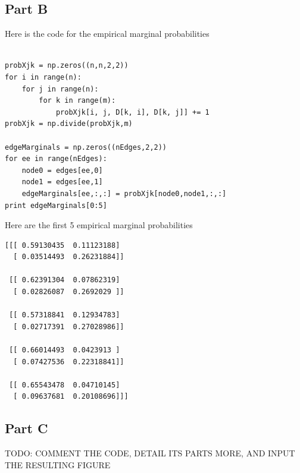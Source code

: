 \documentclass[twoside,11pt]{article}
\theoremstyle{definition}
\begin{document}
\newpage

\subsection*{Part B}

Here is the code for the empirical marginal probabilities
\begin{lstlisting}

probXjk = np.zeros((n,n,2,2))
for i in range(n):
    for j in range(n):
        for k in range(m):
            probXjk[i, j, D[k, i], D[k, j]] += 1
probXjk = np.divide(probXjk,m)

edgeMarginals = np.zeros((nEdges,2,2))
for ee in range(nEdges):
    node0 = edges[ee,0]
    node1 = edges[ee,1]
    edgeMarginals[ee,:,:] = probXjk[node0,node1,:,:]
print edgeMarginals[0:5]

\end{lstlisting}

Here are the first 5 empirical marginal probabilities

\begin{lstlisting}
[[[ 0.59130435  0.11123188]
  [ 0.03514493  0.26231884]]

 [[ 0.62391304  0.07862319]
  [ 0.02826087  0.2692029 ]]

 [[ 0.57318841  0.12934783]
  [ 0.02717391  0.27028986]]

 [[ 0.66014493  0.0423913 ]
  [ 0.07427536  0.22318841]]

 [[ 0.65543478  0.04710145]
  [ 0.09637681  0.20108696]]]
\end{lstlisting}

\subsection*{Part C}

TODO: COMMENT THE CODE, DETAIL ITS PARTS MORE, AND INPUT THE RESULTING FIGURE
\end{document}
